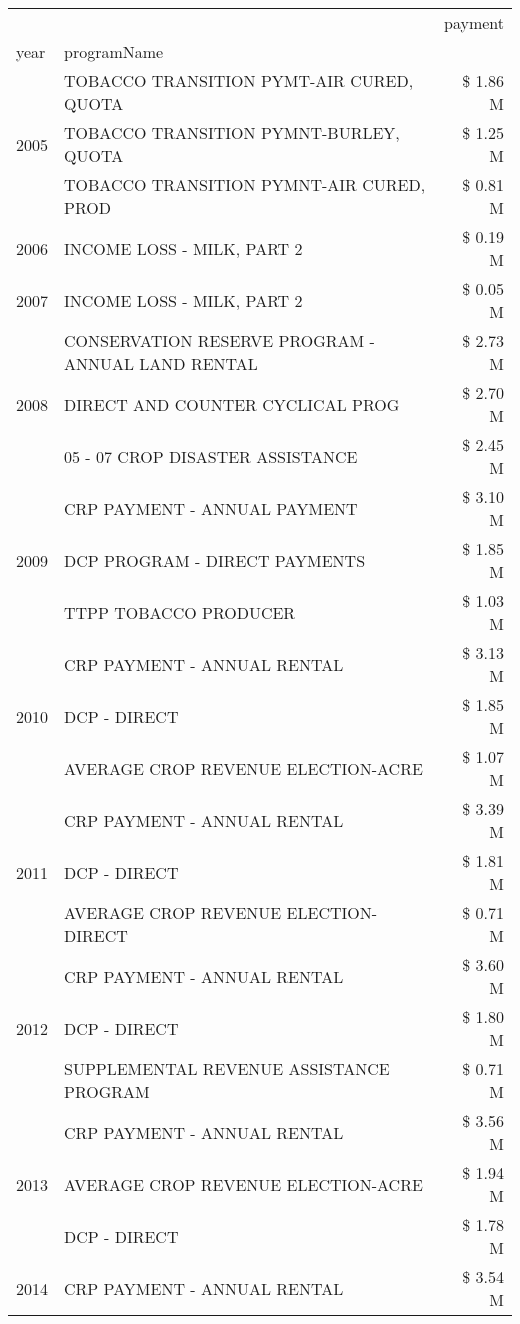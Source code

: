 \begin{tabular}{llr}
\toprule
 &  & payment \\
year & programName &  \\
\midrule
\multirow[t]{3}{*}{2005} & TOBACCO TRANSITION PYMT-AIR CURED, QUOTA & \$ 1.86 M \\
 & TOBACCO TRANSITION PYMNT-BURLEY, QUOTA & \$ 1.25 M \\
 & TOBACCO TRANSITION PYMNT-AIR CURED, PROD & \$ 0.81 M \\
\cline{1-3}
2006 & INCOME LOSS - MILK, PART 2 & \$ 0.19 M \\
\cline{1-3}
2007 & INCOME LOSS - MILK, PART 2 & \$ 0.05 M \\
\cline{1-3}
\multirow[t]{3}{*}{2008} & CONSERVATION RESERVE PROGRAM - ANNUAL LAND RENTAL & \$ 2.73 M \\
 & DIRECT AND COUNTER CYCLICAL PROG & \$ 2.70 M \\
 & 05 - 07 CROP DISASTER ASSISTANCE & \$ 2.45 M \\
\cline{1-3}
\multirow[t]{3}{*}{2009} & CRP PAYMENT - ANNUAL PAYMENT & \$ 3.10 M \\
 & DCP PROGRAM - DIRECT PAYMENTS & \$ 1.85 M \\
 & TTPP TOBACCO PRODUCER & \$ 1.03 M \\
\cline{1-3}
\multirow[t]{3}{*}{2010} & CRP PAYMENT - ANNUAL RENTAL & \$ 3.13 M \\
 & DCP - DIRECT & \$ 1.85 M \\
 & AVERAGE CROP REVENUE ELECTION-ACRE & \$ 1.07 M \\
\cline{1-3}
\multirow[t]{3}{*}{2011} & CRP PAYMENT - ANNUAL RENTAL & \$ 3.39 M \\
 & DCP - DIRECT & \$ 1.81 M \\
 & AVERAGE CROP REVENUE ELECTION-DIRECT & \$ 0.71 M \\
\cline{1-3}
\multirow[t]{3}{*}{2012} & CRP PAYMENT - ANNUAL RENTAL & \$ 3.60 M \\
 & DCP - DIRECT & \$ 1.80 M \\
 & SUPPLEMENTAL REVENUE ASSISTANCE PROGRAM & \$ 0.71 M \\
\cline{1-3}
\multirow[t]{3}{*}{2013} & CRP PAYMENT - ANNUAL RENTAL & \$ 3.56 M \\
 & AVERAGE CROP REVENUE ELECTION-ACRE & \$ 1.94 M \\
 & DCP - DIRECT & \$ 1.78 M \\
\cline{1-3}
\multirow[t]{3}{*}{2014} & CRP PAYMENT - ANNUAL RENTAL & \$ 3.54 M \\

\end{tabular}
